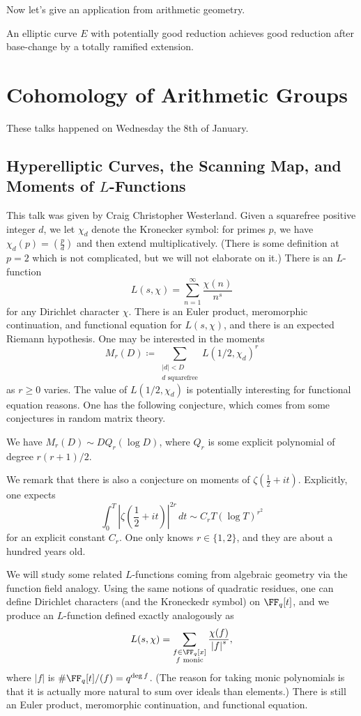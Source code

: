 \documentclass{article}
\begin{document}
Now let's give an application from arithmetic geometry.
\begin{theorem}
	An elliptic curve $E$ with potentially good reduction achieves good reduction after base-change by a totally ramified extension.
\end{theorem}

\section{Cohomology of Arithmetic Groups}
These talks happened on Wednesday the 8th of January.

\subsection{Hyperelliptic Curves, the Scanning Map, and Moments of \texorpdfstring{$L$}{L}-Functions}
This talk was given by Craig Christopher Westerland. Given a squarefree positive integer $d$, we let $\chi_d$ denote the Kronecker symbol: for primes $p$, we have $\chi_d(p)=\left(\frac pd\right)$ and then extend multiplicatively. (There is some definition at $p=2$ which is not complicated, but we will not elaborate on it.) There is an $L$-function
\[L(s,\chi)=\sum_{n=1}^\infty\frac{\chi(n)}{n^s}\]
for any Dirichlet character $\chi$. There is an Euler product, meromorphic continuation, and functional equation for $L(s,\chi)$, and there is an expected Riemann hypothesis. One may be interested in the moments
\[M_r(D)\coloneqq\sum_{\substack{\left|d\right|<D\\d\text{ squarefree}}}L(1/2,\chi_d)^r\]
as $r\ge0$ varies. The value of $L(1/2,\chi_d)$ is potentially interesting for functional equation reasons. One has the following conjecture, which comes from some conjectures in random matrix theory.
\begin{conj}
	We have $M_r(D)\sim DQ_r(\log D)$, where $Q_r$ is some explicit polynomial of degree $r(r+1)/2$.
\end{conj}
\begin{remark}
	We remark that there is also a conjecture on moments of $\zeta\left(\frac12+it\right)$. Explicitly, one expects
	\[\int_0^T\left|\zeta\left(\frac12+it\right)\right|^{2r}\,dt\sim C_rT(\log T)^{r^2}\]
	for an explicit constant $C_r$. One only knows $r\in\{1,2\}$, and they are about a hundred years old.
\end{remark}
We will study some related $L$-functions coming from algebraic geometry via the function field analogy. Using the same notions of quadratic residues, one can define Dirichlet characters (and the Kroneckedr symbol) on $\FF_q[t]$, and we produce an $L$-function defined exactly analogously as
\[L(s,\chi)=\sum_{\substack{f\in\FF_q[x]\\f\text{ monic}}}\frac{\chi(f)}{\left|f\right|^s},\]
where $\left|f\right|$ is $\#\FF_q[t]/(f)=q^{\deg f}$. (The reason for taking monic polynomials is that it is actually more natural to sum over ideals than elements.) There is still an Euler product, meromorphic continuation, and functional equation.
\end{document}
